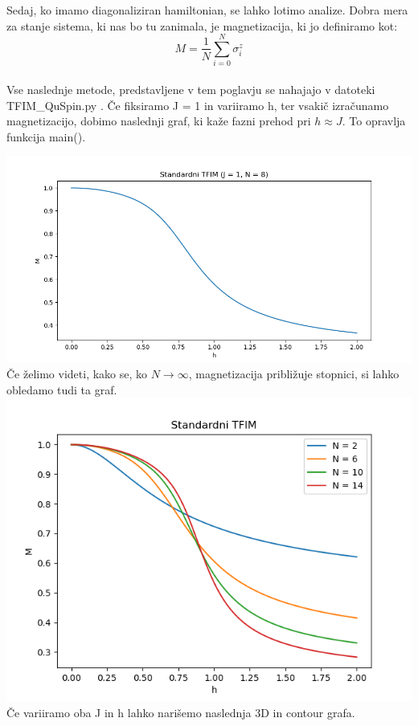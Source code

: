 \documentclass{article}
\begin{document}
 

\noindent Sedaj, ko imamo diagonaliziran hamiltonian, se lahko lotimo analize. Dobra mera za stanje sistema, ki nas bo tu zanimala, je magnetizacija, ki jo definiramo kot:
\begin{equation}
    M = \frac{1}{N}\sum_{i=0}^N \sigma_i^z
\end{equation}\\
Vse naslednje metode, predstavljene v tem poglavju se nahajajo v datoteki TFIM\_QuSpin.py .
Če fiksiramo J = 1 in variiramo h, ter vsakič izračunamo magnetizacijo, dobimo naslednji graf, ki kaže fazni prehod pri $h \approx J$. To opravlja funkcija main().

\includegraphics[width = \linewidth]{STFIM1.png}
Če želimo videti, kako se, ko $N \rightarrow \infty$, magnetizacija približuje stopnici, si lahko obledamo tudi ta graf.
\includegraphics[width = \linewidth]{STFIM_variableN2.png}
\newpage
\noindent Če variiramo oba J in h lahko narišemo naslednja 3D in contour grafa.
\end{document}
